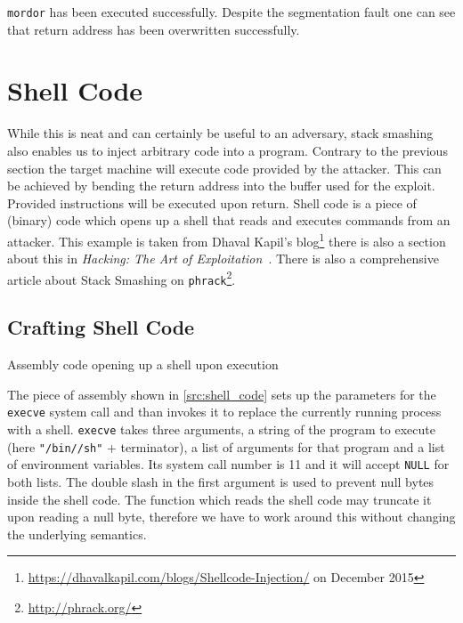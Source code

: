 \documentclass[article]{uibk}
\begin{document}
\texttt{mordor} has been executed successfully. Despite the segmentation
fault one can see that return address has been overwritten successfully.

\section{Shell Code}

While this is neat and can certainly be useful to an adversary, stack smashing
also enables us to inject arbitrary code into a program. Contrary to the
previous section the target machine will execute code provided by the attacker.
This can be achieved by bending the return address into the buffer used for the
exploit. Provided instructions will be executed upon return. Shell code is a
piece of (binary) code which opens up a shell that reads and executes commands
from an attacker. This example is taken from Dhaval Kapil's
blog\footnote{\url{https://dhavalkapil.com/blogs/Shellcode-Injection/} on
December 2015} there is also a section about this in \textit{Hacking: The Art
of Exploitation}~\cite[pp.~281]{art_of_exploitation}. There is also a
comprehensive article \cite{phrack_stack_smash} about Stack Smashing on
\texttt{phrack}\footnote{\url{http://phrack.org/}}.

\subsection{Crafting Shell Code}

\begin{listing}[h!]
    \begin{minipage}[t]{0.4\textwidth}
    \end{minipage}\hfill
    \begin{minipage}[t]{0.5\textwidth}
    \end{minipage}
    \caption{Assembly code opening up a shell upon execution}
    \label{src:shell_code}
\end{listing}

The piece of assembly shown in \cref{src:shell_code} sets up the parameters for
the \texttt{execve} system call and than invokes it to replace the currently
running process with a shell. \texttt{execve} takes three arguments, a string
of the program to execute (here \texttt{"/bin//sh"} + terminator), a list of
arguments for that program and a list of environment variables. Its system call
number is 11 and it will accept \texttt{NULL} for both lists. The double slash
in the first argument is used to prevent null bytes inside the shell code. The
function which reads the shell code may truncate it upon reading a null byte,
therefore we have to work around this without changing the underlying
semantics.
\end{document}
